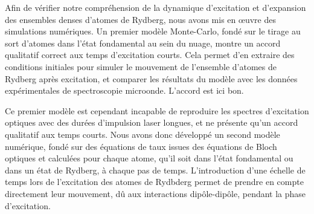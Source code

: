 Afin de vérifier notre compréhension de la dynamique d'excitation et d'expansion des ensembles denses d'atomes de Rydberg, nous avons mis en \oe uvre des simulations numériques.
Un premier modèle Monte-Carlo, fondé sur le tirage au sort d'atomes dans l'état fondamental au sein du nuage, montre un accord qualitatif correct aux temps d'excitation courts.
Cela permet d'en extraire des conditions initiales pour simuler le mouvement de l'ensemble d'atomes de Rydberg après excitation, et comparer les résultats du modèle avec les données expérimentales de spectroscopie microonde.
L'accord est ici bon.

Ce premier modèle est cependant incapable de reproduire les spectres d'excitation optiques avec des durées d'impulsion laser longues, et ne présente qu'un accord qualitatif aux temps courts.
Nous avons donc développé un second modèle numérique, fondé sur des équations de taux issues des équations de Bloch optiques et calculées pour chaque atome, qu'il soit dans l'état fondamental ou dans un état de Rydberg, à chaque pas de temps.
L'introduction d'une échelle de temps lors de l'excitation des atomes de Rydbderg permet de prendre en compte directement leur mouvement, dû aux interactions dipôle-dipôle, pendant la phase d'excitation.

